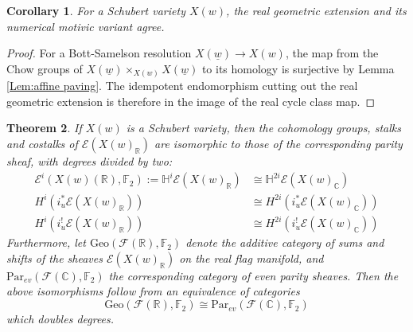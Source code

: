 \documentclass{amsart}
\newtheorem{thm}{Theorem}[section]
\newtheorem{cor}[thm]{Corollary}
\theoremstyle{definition}
\theoremstyle{remark}
\begin{document}
\begin{cor}
For a Schubert variety $X(w)$, the real geometric extension and its numerical motivic variant agree.
\end{cor}

\begin{proof}
For a Bott-Samelson resolution $X(\underline{w})\to X(w)$, the map from the Chow groups of $X(\underline{w})\times_{X(w)}X(\underline{w})$ to its homology is surjective by Lemma \ref{Lem:affine paving}. The idempotent endomorphism cutting out the real geometric extension is therefore in the image of the real cycle class map.
\end{proof}


\begin{thm}\label{Thm:Geo is parity on schubert}
If $X(w)$ is a Schubert variety, then the cohomology groups, stalks and costalks of $\mathscr{E}({X(w)}_\mathbb{R})$ are isomorphic to those of the corresponding parity sheaf, with degrees divided by two:
\begin{align*}
    \mathscr{E}^i(X(w)(\mathbb{R}),\mathbb{F}_2):=\mathbb{H}^i\mathscr{E}(X(w)_\mathbb{R})&\cong \mathbb{H}^{2i}\mathscr{E}(X(w)_\mathbb{C})\\
    H^i(i_u^*\mathscr{E}(X(w)_\mathbb{R}))&\cong H^{2i}(i_u^*\mathscr{E}(X(w)_\mathbb{C}))\\
    H^i(i_u^!\mathscr{E}(X(w)_\mathbb{R}))&\cong H^{2i}(i_u^!\mathscr{E}(X(w)_\mathbb{C}))
\end{align*}
Furthermore, let $\mathrm{Geo}(\mathscr{F}(\mathbb{R}),\mathbb{F}_2)$ denote the additive category of sums and shifts of the sheaves $\mathscr{E}(X(w)_\mathbb{R})$ on the real flag manifold, and $\mathrm{Par}_{ev}(\mathscr{F}(\mathbb{C}),\mathbb{F}_2)$ the corresponding category of even parity sheaves. Then the above isomorphisms follow from an equivalence of categories \[\mathrm{Geo}(\mathscr{F}(\mathbb{R}),\mathbb{F}_2)\cong \mathrm{Par}_{ev}(\mathscr{F}(\mathbb{C}),\mathbb{F}_2)\] which doubles degrees.
\end{thm}
\end{document}
